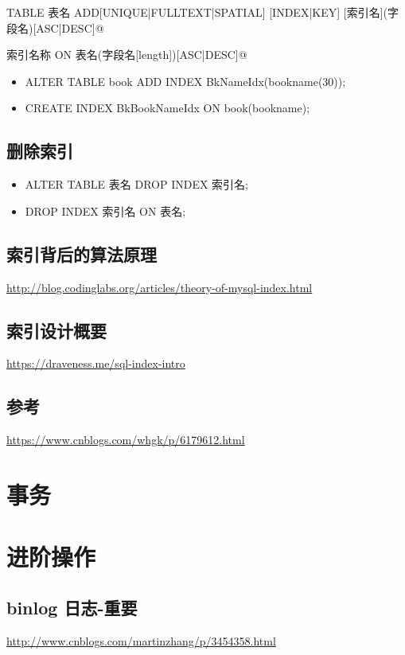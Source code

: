 \documentclass[UTF8,a4paper,12pt]{ctexbook}
\begin{document}
		\verb@ALTER TABLE 表名 ADD[UNIQUE|FULLTEXT|SPATIAL] [INDEX|KEY] [索引名](字段名)[ASC|DESC]@
		
		 索引名称 ON 表名(字段名[length])[ASC|DESC]@
		
		\begin{itemize}
			\item ALTER TABLE book ADD INDEX BkNameIdx(bookname(30));
			\item CREATE INDEX BkBookNameIdx ON book(bookname);
		\end{itemize}
	
	\section{删除索引}
		\begin{itemize}
			\item ALTER TABLE 表名 DROP INDEX 索引名;
			\item DROP INDEX 索引名 ON 表名;
		\end{itemize}
	
	\section{索引背后的算法原理}
		\url{http://blog.codinglabs.org/articles/theory-of-mysql-index.html}	
	
	
	\section{索引设计概要}
		\url{https://draveness.me/sql-index-intro}
			
	\section{参考}
		\url{https://www.cnblogs.com/whgk/p/6179612.html}
			
	
	
\chapter{事务}

	
\chapter{进阶操作} 
	\section{binlog 日志-重要}
		\url{http://www.cnblogs.com/martinzhang/p/3454358.html}
		
\end{document}
